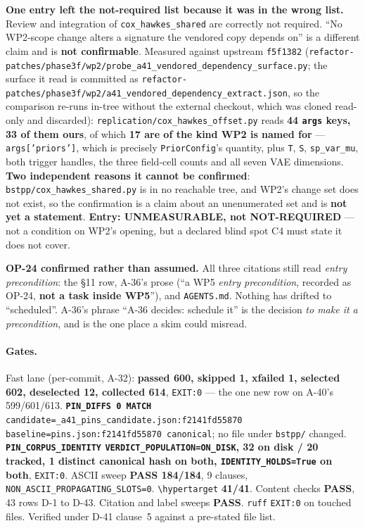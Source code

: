 \documentclass[
  10pt,
]{article}
\begin{document}
\textbf{One entry left the not-required list because it was in the wrong list.} Review and integration of \texttt{cox\_hawkes\_shared} are correctly not required. ``No WP2-scope change alters a signature the vendored copy depends on'' is a different claim and is \textbf{not confirmable}. Measured against upstream \texttt{f5f1382} (\texttt{refactor-patches/\allowbreak{}phase3f/wp2/\allowbreak{}probe\_a41\_vendored\_dependency\_surface.py}; the surface it read is committed as \texttt{refactor-patches/\allowbreak{}phase3f/wp2/\allowbreak{}a41\_vendored\_dependency\_extract.json}, so the comparison re-runs in-tree without the external checkout, which was cloned read-only and discarded): \texttt{replication/\allowbreak{}cox\_hawkes\_offset.py} reads \textbf{44 \texttt{args} keys, 33 of them ours}, of which \textbf{17 are of the kind WP2 is named for} --- \texttt{args['priors']}, which is precisely \texttt{PriorConfig}'s quantity, plus \texttt{T}, \texttt{S}, \texttt{sp\_var\_mu}, both trigger handles, the three field-cell counts and all seven VAE dimensions. \textbf{Two independent reasons it cannot be confirmed}: \texttt{bstpp/\allowbreak{}cox\_hawkes\_shared.py} is in no reachable tree, and WP2's change set does not exist, so the confirmation is a claim about an unenumerated set and is \textbf{not yet a statement}. \textbf{Entry: UNMEASURABLE, not NOT-REQUIRED} --- not a condition on WP2's opening, but a declared blind spot C4 must state it does not cover.

\textbf{OP-24 confirmed rather than assumed.} All three citations still read \emph{entry precondition}: the §11 row, A-36's prose (``a WP5 \emph{entry precondition}, recorded as OP-24, \textbf{not a task inside WP5}''), and \texttt{AGENTS.md}. Nothing has drifted to ``scheduled''. A-36's phrase ``A-36 decides: schedule it'' is the decision \emph{to make it a precondition}, and is the one place a skim could misread.

\paragraph{Gates.}
Fast lane (per-commit, A-32): \textbf{passed 600, skipped 1, xfailed 1, selected 602, deselected 12, collected 614}, \texttt{EXIT:0} --- the one new row on A-40's 599/601/613. \textbf{\texttt{PIN\_DIFFS 0 MATCH}} \texttt{candidate=\allowbreak{}\_a41\_pins\_candidate.json:\allowbreak{}f2141fd55870 baseline=\allowbreak{}pins.json:\allowbreak{}f2141fd55870 canonical}; no file under \texttt{bstpp/} changed. \textbf{\texttt{PIN\_CORPUS\_IDENTITY} \texttt{VERDICT\_POPULATION=ON\_DISK}, 32 on disk / 20 tracked, 1 distinct canonical hash on both, \texttt{IDENTITY\_HOLDS=True} on both}, \texttt{EXIT:0}. ASCII sweep \textbf{PASS 184/184}, 9 clauses, \texttt{NON\_ASCII\_PROPAGATING\_SLOTS=0}. \texttt{\textbackslash hypertarget} \textbf{41/41}. Content checks \textbf{PASS}, 43 rows D-1 to D-43. Citation and label sweeps \textbf{PASS}. \texttt{ruff} \texttt{EXIT:0} on touched files. Verified under D-41 clause~5 against a pre-stated file list.
\end{document}
